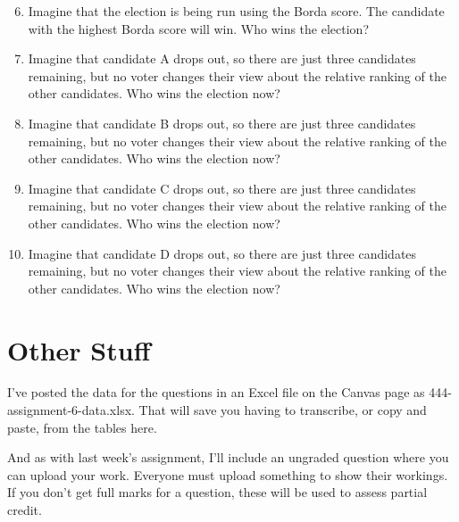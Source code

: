 \begin{enumerate}
\setcounter{enumi}{5}
\item{} Imagine that the election is being run using the Borda score. The candidate with the highest Borda score will win. Who wins the election?

\item{} Imagine that candidate A drops out, so there are just three candidates remaining, but no voter changes their view about the relative ranking of the other candidates. Who wins the election now?

\item{} Imagine that candidate B drops out, so there are just three candidates remaining, but no voter changes their view about the relative ranking of the other candidates. Who wins the election now?

\item{} Imagine that candidate C drops out, so there are just three candidates remaining, but no voter changes their view about the relative ranking of the other candidates. Who wins the election now?

\item{} Imagine that candidate D drops out, so there are just three candidates remaining, but no voter changes their view about the relative ranking of the other candidates. Who wins the election now?

\end{enumerate}

\section{Other Stuff}

I've posted the data for the questions in an Excel file on the Canvas page as 444-assignment-6-data.xlsx. That will save you having to transcribe, or copy and paste, from the tables here. \smallskip

And as with last week's assignment, I'll include an ungraded question where you can upload your work. Everyone must upload something to show their workings. If you don't get full marks for a question, these will be used to assess partial credit.



